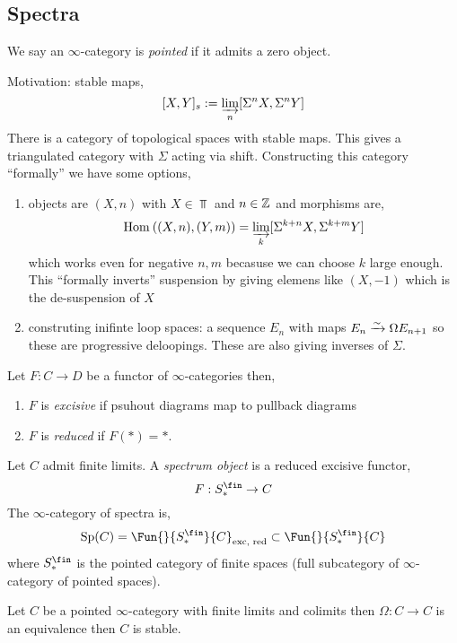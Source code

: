 \documentclass[12pt]{article}
\begin{document}
\subsection{Spectra}

\begin{defn}
We say an $\infty$-category is \textit{pointed} if it admits a zero object. 
\end{defn}

Motivation: stable maps,
\[ [X, Y]_s : = \varinjlim_n [\Sigma^n X, \Sigma^n Y] \]
There is a category of topological spaces with stable maps. This gives a triangulated category with $\Sigma$ acting via shift. Constructing this category ``formally'' we have some options,
\begin{enumerate}
\item objects are $(X, n)$ with $X \in \Top$ and $n \in \mathbb{Z}$ and morphisms are,
\[ \mathrm{Hom}_{} \left( (X, n), (Y, m) \right) = \varinjlim_k [\Sigma^{k+n} X, \Sigma^{k+m} Y] \]
which works even for negative $n, m$ becasuse we can choose $k$ large enough. This ``formally inverts'' suspension by giving elemens like $(X, -1)$ which is the de-suspension of $X$

\item construting inifinte loop spaces: a sequence $E_n$ with maps $E_n \xrightarrow{\sim} \Omega E_{n+1}$ so these are progressive deloopings. These are also giving inverses of $\Sigma$.
\end{enumerate}

\begin{defn}
Let $F : C \to D$ be a functor of $\infty$-categories then,
\begin{enumerate}
\item $F$ is \textit{excisive} if psuhout diagrams map to pullback diagrams
\item $F$ is \textit{reduced} if $F(*) = *$. 
\end{enumerate}
\end{defn}

\begin{defn}
Let $C$ admit finite limits. A \textit{spectrum object} is a reduced excisive functor,
\[ F : S^\fin_* \to C \]
The $\infty$-category of spectra is,
\[ \Sp(C) = \Fun{}{S^\fin_*}{C}_{\text{exc, red}} \subset \Fun{}{S^\fin_*}{C} \]
where $S^\fin_*$ is the pointed category of finite spaces (full subcategory of $\infty$-category of pointed spaces). 
\end{defn}

\begin{prop}[1.4.2.11]
Let $C$ be a pointed $\infty$-category with finite limits and colimits then $\Omega : C \to C$ is an equivalence then $C$ is stable. 
\end{prop}
\end{document}
